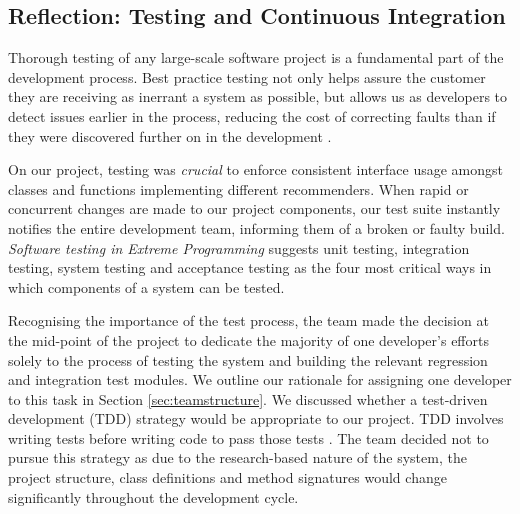 \documentclass{l3proj}
\begin{document}
\subsection{Reflection: Testing and Continuous Integration}
\label{sec:testing}
% 




Thorough testing of any large-scale software project is a fundamental part of the development process. Best practice testing not only helps assure the customer they are receiving as inerrant a system as possible, but allows us as developers to detect issues earlier in the process, reducing the cost of correcting faults than if they were discovered further on in the development \cite{SoftwareEconomics}. 

On our project, testing was \textit{crucial} to enforce consistent interface usage amongst classes and functions implementing different recommenders. When rapid or concurrent changes are made to our project components, our test suite instantly notifies the entire development team, informing them of a broken or faulty build. \textit{Software testing in Extreme Programming} \cite{SoftwareTesting} suggests unit testing, integration testing, system testing and acceptance testing as the four most critical ways in which components of a system can be tested. 

Recognising the importance of the test process, the team made the decision at the mid-point of the project to dedicate the majority of one developer's efforts solely to the process of testing the system and building the relevant regression and integration test modules. We outline our rationale for assigning one developer to this task in Section \ref{sec:teamstructure}. We discussed whether a test-driven development (TDD) strategy would be appropriate to our project. TDD involves writing tests before writing code to pass those tests \cite{TDD}. The team decided not to pursue this strategy as due to the research-based nature of the system, the project structure, class definitions and method signatures would change significantly throughout the development cycle. 
\end{document}
